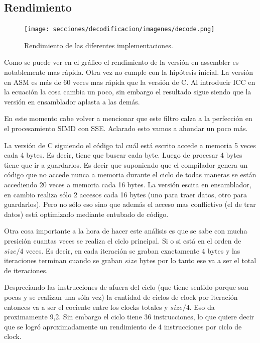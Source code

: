 \newpage

\subsection{Rendimiento}

\begin{figure}[h]
\begin{center}
  \texttt{[image: secciones/decodificacion/imagenes/decode.png]}
\end{center}
\caption{Rendimiento de las diferentes implementaciones.}
\label{fig:rendimiento decode}
\end{figure}

	Como se puede ver en el gráfico el rendimiento de la versión en assembler es notablemente mas rápida. Otra
vez no cumple con la hipótesis inicial. La versión en ASM es más de 60 veces mas rápida que la versión
de C. Al introducir ICC en la ecuación la cosa cambia un poco, sin embargo el resultado sigue siendo que
la versión en ensamblador aplasta a las demás.

	En este momento cabe volver a mencionar que este filtro calza a la perfección en el procesamiento
SIMD con SSE. Aclarado esto vamos a ahondar un poco más.

	La versión de C siguiendo el código tal cuál está escrito accede a memoria 5 veces cada 4 bytes.
Es decir, tiene que buscar cada byte. Luego de procesar 4 bytes tiene que ir a guardarlos. Es decir
que suponiendo que el compilador genera un código que no accede nunca a memoria durante el ciclo de todas
maneras se están accediendo 20 veces a memoria cada 16 bytes. La versión escita en ensamblador, en cambio
realiza sólo 2 accesos cada 16 bytes (uno para traer datos, otro para guardarlos). Pero no sólo eso sino
que además el acceso mas conflictivo (el de trar datos) está optimizado mediante entubado de código.

	Otra cosa importante a la hora de hacer este análisis es que se sabe con mucha presición
cuantas veces se realiza el ciclo principal. Si o si está en el orden de $size/4$ veces. Es decir,
en cada iteración se graban exactamente 4 bytes y las iteraciones terminan cuando se graban $size$ bytes
por lo tanto ese va a ser el total de iteraciones.

	Despreciando las instrucciones de afuera del ciclo (que tiene sentido porque son pocas y se
realizan una sóla vez) la cantidad de ciclos de clock por iteración entonces va a ser el cociente
entre los clocks totales y $size/4$. Eso da proximamente 9,2. Sin embargo el ciclo tiene 36
instrucciones, lo que quiere decir que se logró aproximadamente un rendimiento de 4 instrucciones
por ciclo de clock.

